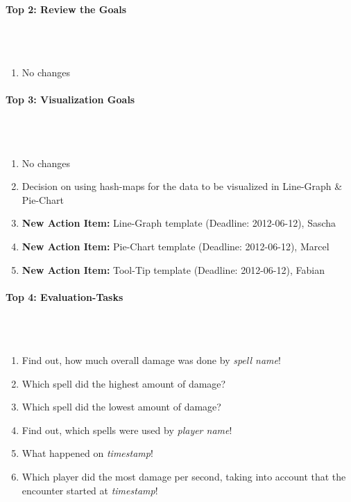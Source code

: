 \documentclass{scrartcl}
\begin{document}
\paragraph{Top 2: Review the Goals}
\hfill \\ \hfill \\
\begin {enumerate}
\item No changes
\end {enumerate}

\paragraph{Top 3: Visualization Goals}
\hfill \\ \hfill \\
\begin {enumerate}
\item No changes
\item Decision on using hash-maps for the data to be visualized in Line-Graph \& Pie-Chart
\item \textbf{New Action Item:} Line-Graph template (Deadline: 2012-06-12), Sascha 
\item \textbf{New Action Item:} Pie-Chart template (Deadline: 2012-06-12), Marcel 
\item \textbf{New Action Item:} Tool-Tip template (Deadline: 2012-06-12), Fabian 
\end {enumerate}

\paragraph{Top 4: Evaluation-Tasks}
\hfill \\ \hfill \\
\begin {enumerate}
\item Find out, how much overall damage was done by \textit{spell name}!
\item Which spell did the highest amount of damage?
\item Which spell did the lowest amount of damage?
\item Find out, which spells were used by \textit{player name}!
\item What happened on \textit{timestamp}!
\item Which player did the most damage per second, taking into account that the encounter started at \textit{timestamp}!
\end {enumerate}
\end{document}

